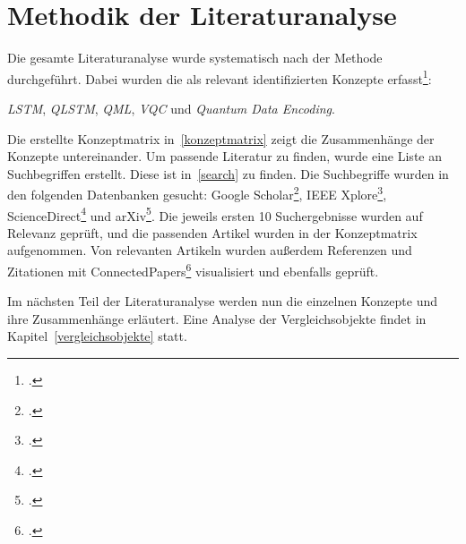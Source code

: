\section{Methodik der Literaturanalyse}

Die gesamte Literaturanalyse wurde systematisch nach der Methode \cite{Webster2002} durchgeführt. Dabei wurden die als relevant identifizierten Konzepte erfasst\footcite[Vgl.][S. 15]{Webster2002}:

\textit{\ac{LSTM}},
\textit{\ac{QLSTM}},
\textit{\ac{QML}},
\textit{\ac{VQC}} und
\textit{Quantum Data Encoding}. 

Die erstellte Konzeptmatrix in~\ref{konzeptmatrix} zeigt die Zusammenhänge der Konzepte untereinander.
Um passende Literatur zu finden, wurde eine Liste an Suchbegriffen erstellt. Diese ist in~\ref{search} zu finden. Die Suchbegriffe wurden in den folgenden Datenbanken gesucht: Google Scholar\footcite{https://scholar.google.com/}, IEEE Xplore\footcite{https://ieeexplore.ieee.org/}, ScienceDirect\footcite{https://www.sciencedirect.com/} und arXiv\footcite{https://arxiv.org/}.
Die jeweils ersten 10 Suchergebnisse wurden auf Relevanz geprüft, und die passenden Artikel wurden in der Konzeptmatrix aufgenommen.
Von relevanten Artikeln wurden außerdem Referenzen und Zitationen mit ConnectedPapers\footcite{https://www.connectedpapers.com/} visualisiert und ebenfalls geprüft.

Im nächsten Teil der Literaturanalyse werden nun die einzelnen Konzepte und ihre Zusammenhänge erläutert. Eine Analyse der Vergleichsobjekte findet in Kapitel~\ref{vergleichsobjekte} statt.
